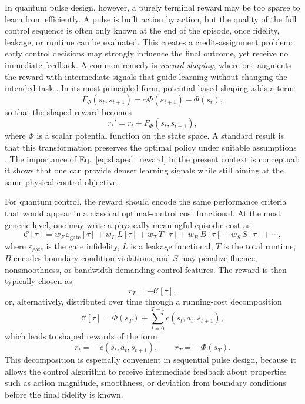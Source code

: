 In quantum pulse design, however, a purely terminal reward may be too sparse to learn from efficiently. A pulse is built action by action, but the quality of the full control sequence is often only known at the end of the episode, once fidelity, leakage, or runtime can be evaluated. This creates a credit-assignment problem: early control decisions may strongly influence the final outcome, yet receive no immediate feedback. A common remedy is \emph{reward shaping}, where one augments the reward with intermediate signals that guide learning without changing the intended task \cite{Ng1999,SuttonBarto2018}. In its most principled form, potential-based shaping adds a term
\begin{equation}
F_{\Phi}(s_t,s_{t+1})
=
\gamma \Phi(s_{t+1}) - \Phi(s_t),
\label{eq:potential_based_shaping}
\end{equation}
so that the shaped reward becomes
\begin{equation}
r_t'
=
r_t + F_{\Phi}(s_t,s_{t+1}),
\label{eq:shaped_reward}
\end{equation}
where $\Phi$ is a scalar potential function on the state space. A standard result is that this transformation preserves the optimal policy under suitable assumptions \cite{Ng1999}. The importance of Eq.~\eqref{eq:shaped_reward} in the present context is conceptual: it shows that one can provide denser learning signals while still aiming at the same physical control objective.

For quantum control, the reward should encode the same performance criteria that would appear in a classical optimal-control cost functional. At the most generic level, one may write a physically meaningful episodic cost as
\begin{equation}
\mathcal{C}[\tau]
=
w_F \,\varepsilon_{\mathrm{gate}}[\tau]
+
w_L \,L[\tau]
+
w_T \,T[\tau]
+
w_B \,B[\tau]
+
w_S \,S[\tau]
+
\cdots,
\label{eq:generic_physical_cost_rl}
\end{equation}
where $\varepsilon_{\mathrm{gate}}$ is the gate infidelity, $L$ is a leakage functional, $T$ is the total runtime, $B$ encodes boundary-condition violations, and $S$ may penalize fluence, nonsmoothness, or bandwidth-demanding control features. The reward is then typically chosen as
\begin{equation}
r_T = -\mathcal{C}[\tau],
\label{eq:final_reward_generic_cost}
\end{equation}
or, alternatively, distributed over time through a running-cost decomposition
\begin{equation}
\mathcal{C}[\tau]
=
\Phi(s_T)
+
\sum_{t=0}^{T-1} c(s_t,a_t,s_{t+1}),
\label{eq:running_cost_decomposition}
\end{equation}
which leads to shaped rewards of the form
\begin{equation}
r_t = -\,c(s_t,a_t,s_{t+1}),
\qquad
r_T = -\,\Phi(s_T).
\label{eq:running_reward_form}
\end{equation}
This decomposition is especially convenient in sequential pulse design, because it allows the control algorithm to receive intermediate feedback about properties such as action magnitude, smoothness, or deviation from boundary conditions before the final fidelity is known.

